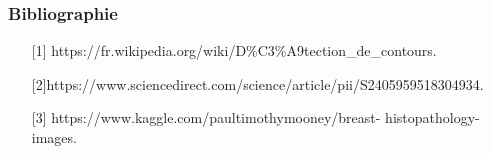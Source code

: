 \documentclass[9pt]{beamer}
\begin{document}

\begin{frame}
\renewcommand{\bibfont}{\footnotesize}
\frametitle{Bibliographie}



\begin{itemize}
    \item [] [1] https://fr.wikipedia.org/wiki/D\%C3\%A9tection\_de\_contours.\\
    \item [] [2]https://www.sciencedirect.com/science/article/pii/S2405959518304934.\\
    \end{itemize}
    \begin{itemize}
    
    \item [] [3] https://www.kaggle.com/paultimothymooney/breast- histopathology-images.
\end{itemize} 


\end{frame}
\end{document}
